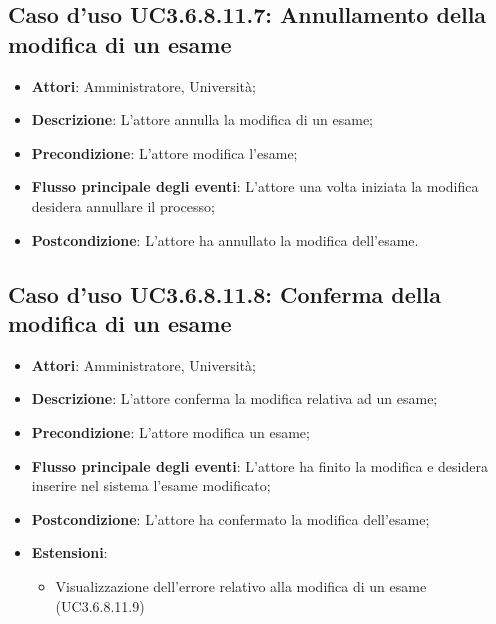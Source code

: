 \subsection{Caso d'uso \texorpdfstring{UC3.6.8.11.7}{UC3.6.8.11.7}: Annullamento della modifica di un esame}
\begin{itemize}
\item \textbf{Attori}: Amministratore, Università;
\item \textbf{Descrizione}: L'attore annulla la modifica di un esame;

\item \textbf{Precondizione}: L'attore modifica l'esame;

\item \textbf{Flusso principale degli eventi}: L'attore una volta iniziata la modifica desidera annullare il processo;

\item \textbf{Postcondizione}: L'attore ha annullato la modifica dell'esame.

\end{itemize}
\subsection{Caso d'uso \texorpdfstring{UC3.6.8.11.8}{UC3.6.8.11.8}: Conferma della modifica di un esame}
\begin{itemize}
\item \textbf{Attori}: Amministratore, Università;
\item \textbf{Descrizione}: L'attore conferma la modifica relativa ad un esame;

\item \textbf{Precondizione}: L'attore modifica un esame;

\item \textbf{Flusso principale degli eventi}: L'attore ha finito la modifica e desidera inserire nel sistema l'esame modificato;

\item \textbf{Postcondizione}: L'attore ha confermato la modifica dell'esame;

\item \textbf{Estensioni}:
\begin{itemize}
\item Visualizzazione dell'errore relativo alla modifica di un esame (UC3.6.8.11.9)
\end{itemize}
\end{itemize}
